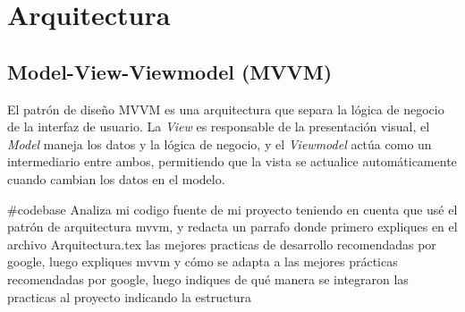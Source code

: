 \section{Arquitectura}

\subsection{Model-View-Viewmodel (MVVM)}
El patrón de diseño MVVM es una arquitectura que separa la lógica de negocio de la interfaz de usuario. La \textit{View} es responsable de la presentación visual, el \textit{Model} maneja los datos y la lógica de negocio, y el \textit{Viewmodel} actúa como un intermediario entre ambos, permitiendo que la vista se actualice automáticamente cuando cambian los datos en el modelo.

#codebase Analiza mi codigo fuente de mi proyecto teniendo en cuenta que usé el patrón de arquitectura mvvm, y redacta un parrafo donde primero expliques en el archivo Arquitectura.tex las mejores practicas de desarrollo recomendadas por google, luego expliques mvvm y cómo se adapta a las mejores prácticas recomendadas por google, luego indiques de qué manera se integraron las practicas al proyecto indicando la estructura
